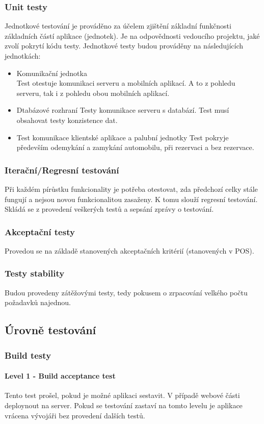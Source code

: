 \documentclass[a4paper,titlepage]{article}
\begin{document}
	\subsubsection{Unit testy}
	Jednotkové testování je prováděno za účelem zjištění základní funkčnosti základních částí aplikace (jednotek). Je na odpovědnosti vedoucího projektu, jaké zvolí pokrytí kódu testy. Jednotkové testy budou prováděny na následujících jednotkách:
	\begin{itemize}
		\item Komunikační jednotka\\
		Test otestuje komunikaci serveru a mobilních aplikací. A to z pohledu serveru, tak i z pohledu obou mobilních aplikací. 
		\item Dtabázové rozhraní
		Testy komunikace serveru s databází. Test musí obsahovat testy konzistence dat.
		\item Test komunikace klientské aplikace a palubní jednotky
		Test pokryje především odemykání a zamykání automobilu, při rezervaci a bez rezervace.
	\end{itemize}
	\subsubsection{Iterační/Regresní testování}
	Při každém pírůstku funkcionality je potřeba otestovat, zda předchozí celky stále fungují a nejsou novou funkcionalitou zasaženy. K tomu slouží regresní testování. Skládá se z provedení veškerých testů a sepsání zprávy o testování.
	\subsubsection{Akceptační testy}
	Provedou se na základě stanovených akceptačních kritérií (stanovených v POS).
	\subsubsection{Testy stability}
	Budou provedeny zátěžovými testy, tedy pokusem o zrpacování velkého počtu požadavků najednou.
\subsection{Úrovně testování}
\subsubsection{Build testy}
\paragraph{Level 1 - Build acceptance test}
Tento test prošel, pokud je možné aplikaci sestavit. V případě webové části deploynout na server. Pokud se testování zastaví na tomto levelu je aplikace vrácena vývojáři bez provedení dalších testů.
\end{document}
